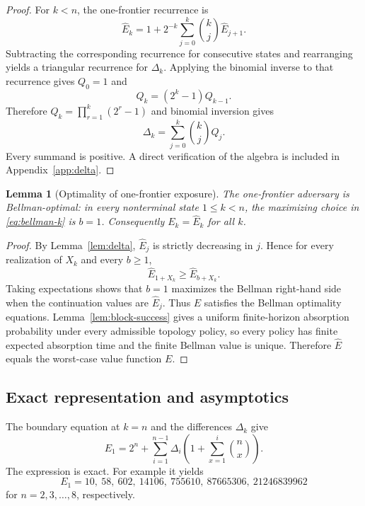 \documentclass[11pt]{article}
\newtheorem{lemma}[theorem]{Lemma}
\begin{document}
\begin{proof}
For $k<n$, the one-frontier recurrence is
\[
  \widehat E_k
  =1+2^{-k}\sum_{j=0}^{k}\binom{k}{j}\widehat E_{j+1}.
\]
Subtracting the corresponding recurrence for consecutive states and rearranging yields a triangular recurrence for $\Delta_k$. Applying the binomial inverse to that recurrence gives $Q_0=1$ and
\[
  Q_k=(2^k-1)Q_{k-1}.
\]
Therefore $Q_k=\prod_{r=1}^{k}(2^r-1)$ and binomial inversion gives
\[
  \Delta_k=\sum_{j=0}^{k}\binom{k}{j}Q_j.
\]
Every summand is positive. A direct verification of the algebra is included in Appendix~\ref{app:delta}.\qedhere
\end{proof}

\begin{lemma}[Optimality of one-frontier exposure]\label{lem:optimal-adversary}
The one-frontier adversary is Bellman-optimal: in every nonterminal state $1\le k<n$, the maximizing choice in \eqref{eq:bellman-k} is $b=1$. Consequently $E_k=\widehat E_k$ for all $k$.
\end{lemma}

\begin{proof}
By Lemma~\ref{lem:delta}, $\widehat E_j$ is strictly decreasing in $j$. Hence for every realization of $X_k$ and every $b\ge1$,
\[
  \widehat E_{1+X_k}\ge \widehat E_{b+X_k}.
\]
Taking expectations shows that $b=1$ maximizes the Bellman right-hand side when the continuation values are $\widehat E_j$. Thus $\widehat E$ satisfies the Bellman optimality equations. Lemma~\ref{lem:block-success} gives a uniform finite-horizon absorption probability under every admissible topology policy, so every policy has finite expected absorption time and the finite Bellman value is unique. Therefore $\widehat E$ equals the worst-case value function $E$.\qedhere
\end{proof}

\subsection{Exact representation and asymptotics}

The boundary equation at $k=n$ and the differences $\Delta_k$ give
\begin{equation}\label{eq:E1-exact}
  E_1
  =2^n+
   \sum_{i=1}^{n-1}
   \Delta_i\left(1+\sum_{x=1}^{i}\binom{n}{x}\right).
\end{equation}
The expression is exact. For example it yields
\[
  E_1=10,\ 58,\ 602,\ 14106,\ 755610,\ 87665306,\ 21246839962
\]
for $n=2,3,\ldots,8$, respectively.
\end{document}

